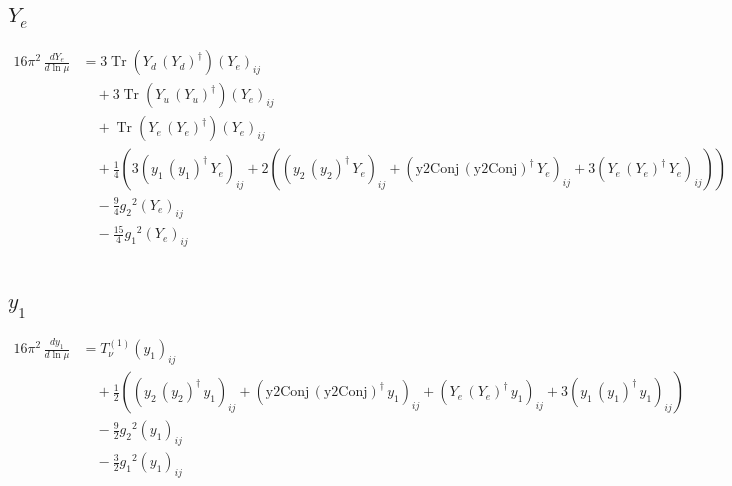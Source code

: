 \documentclass[10pt,a4paper]{article}
\begin{document}
\subsection*{$Y_e$}
\begin{align*}
16\pi^2\,\frac{d Y_e}{d\ln\mu} &=3 \operatorname{Tr}\!\left({Y_d}\,\left({Y_d}\right)^{\dagger}\right) \left({Y_e}\right)_{ij} \\
&\quad +3 \operatorname{Tr}\!\left({Y_u}\,\left({Y_u}\right)^{\dagger}\right) \left({Y_e}\right)_{ij} \\
&\quad +\operatorname{Tr}\!\left({Y_e}\,\left({Y_e}\right)^{\dagger}\right) \left({Y_e}\right)_{ij} \\
&\quad +\frac{1}{4} (3 \left({y_1}\,\left({y_1}\right)^{\dagger}\,{Y_e}\right)_{ij}+2 (\left({y_2}\,\left({y_2}\right)^{\dagger}\,{Y_e}\right)_{ij}+\left(\text{y2Conj}\,\left(\text{y2Conj}\right)^{\dagger}\,{Y_e}\right)_{ij}+3 \left({Y_e}\,\left({Y_e}\right)^{\dagger}\,{Y_e}\right)_{ij})) \\
&\quad -\frac{9}{4} {g_2}^2 \left({Y_e}\right)_{ij} \\
&\quad -\frac{15}{4} {g_1}^2 \left({Y_e}\right)_{ij} \\
\end{align*}
\subsection*{$y_1$}
\begin{align*}
16\pi^2\,\frac{d y_1}{d\ln\mu} &=T_{\nu}^{(1)} \left({y_1}\right)_{ij} \\
&\quad +\frac{1}{2} (\left({y_2}\,\left({y_2}\right)^{\dagger}\,{y_1}\right)_{ij}+\left(\text{y2Conj}\,\left(\text{y2Conj}\right)^{\dagger}\,{y_1}\right)_{ij}+\left({Y_e}\,\left({Y_e}\right)^{\dagger}\,{y_1}\right)_{ij}+3 \left({y_1}\,\left({y_1}\right)^{\dagger}\,{y_1}\right)_{ij}) \\
&\quad -\frac{9}{2} {g_2}^2 \left({y_1}\right)_{ij} \\
&\quad -\frac{3}{2} {g_1}^2 \left({y_1}\right)_{ij} \\
\end{align*}
\end{document}
